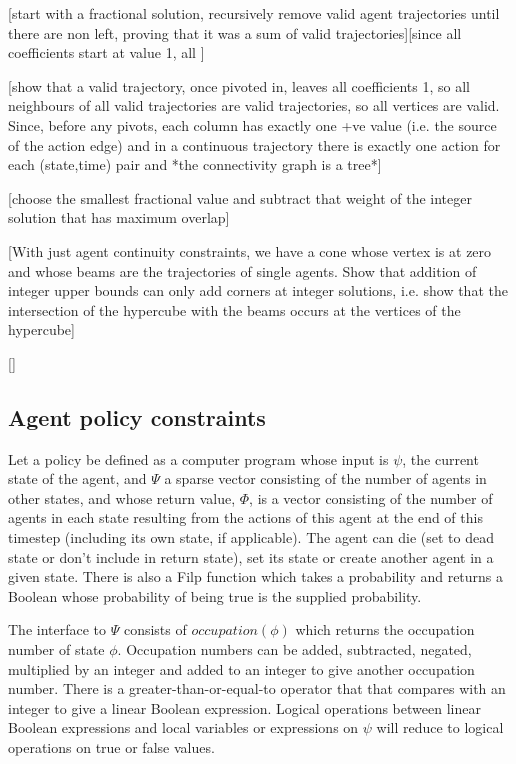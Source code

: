 \documentclass{article}
\begin{document}
[start with a fractional solution, recursively remove valid agent trajectories until there are non left, proving that it was a sum of valid trajectories][since all coefficients start at value 1, all ]

[show that a valid trajectory, once pivoted in, leaves all coefficients 1, so all neighbours of all valid trajectories are valid trajectories, so all vertices are valid. Since, before any pivots, each column has exactly one +ve value (i.e. the source of the action edge) and in a continuous trajectory there is exactly one action for each (state,time) pair and *the connectivity graph is a tree*]

[choose the smallest fractional value and subtract that weight of the integer solution that has maximum overlap]


[With just agent continuity constraints, we have a cone whose vertex is at zero and whose beams are the trajectories of single agents. Show that addition of integer upper bounds can only add corners at integer solutions, i.e. show that the intersection of the hypercube with the beams occurs at the vertices of the hypercube]

[]






\subsection{Agent policy constraints}

Let a policy be defined as a computer program whose input is $\psi$, the current state of the agent, and $\Psi$ a sparse vector consisting of the number of agents in other states, and whose return value, $\Phi$, is a vector consisting of the number of agents in each state resulting from the actions of this agent at the end of this timestep (including its own state, if applicable). The agent can die (set to dead state or don't include in return state), set its state or create another agent in a given state. There is also a Filp function which takes a probability and returns a Boolean whose probability of being true is the supplied probability.

The interface to $\Psi$ consists of $occupation(\phi)$ which returns the occupation number of state $\phi$. Occupation numbers can be added, subtracted, negated, multiplied by an integer and added to an integer to give another occupation number. There is a greater-than-or-equal-to operator that that compares with an integer to give a linear Boolean expression. Logical operations between linear Boolean expressions and local variables or expressions on $\psi$ will reduce to logical operations on true or false values.
\end{document}
